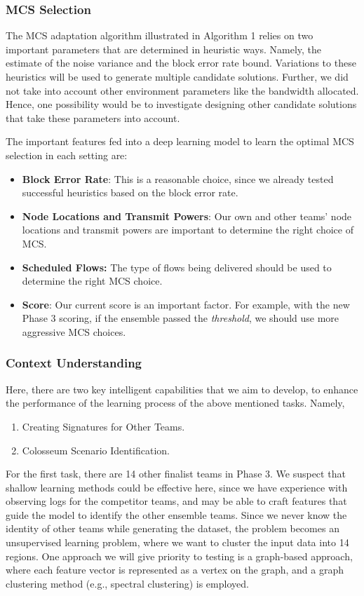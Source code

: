 \documentclass[11pt]{article}
\begin{document}
\subsubsection{MCS Selection}
The MCS adaptation algorithm illustrated in Algorithm 1 relies on two important parameters that are determined in heuristic ways. Namely, the estimate of the noise variance and the block error rate bound. Variations to these heuristics will be used to generate multiple candidate solutions. Further, we did not take into account other environment parameters like the bandwidth allocated. Hence, one possibility would be to investigate designing other candidate solutions that take these parameters into account.

The important features fed into a deep learning model to learn the optimal MCS selection in each setting are:
\begin{itemize}
    \item {\bf Block Error Rate}: This is a reasonable choice, since we already tested successful heuristics based on the block error rate.
    \item {\bf Node Locations and Transmit Powers}: Our own and other teams' node locations and transmit powers are important to determine the right choice of MCS.
    \item {\bf Scheduled Flows:} The type of flows being delivered should be used to determine the right MCS choice.
    \item {\bf Score}: Our current score is an important factor. For example, with the new Phase 3 scoring, if the ensemble passed the \emph{threshold}, we should use more aggressive MCS choices.
\end{itemize}
\subsubsection{Context Understanding}\label{sec:context}
Here, there are two key intelligent capabilities that we aim to develop, to enhance the performance of the learning process of the above mentioned tasks. Namely,
\begin{enumerate}
    \item Creating Signatures for Other Teams.
    \item Colosseum Scenario Identification.
\end{enumerate}
For the first task, there are 14 other finalist teams in Phase 3. We suspect that shallow learning methods could be effective here, since we have experience with observing logs for the competitor teams, and may be able to craft features that guide the model to identify the other ensemble teams. Since we never know the identity of other teams while generating the dataset, the problem becomes an unsupervised learning problem, where we want to cluster the input data into 14 regions. One approach we will give priority to testing is a graph-based approach, where each feature vector is represented as a vertex on the graph, and a graph clustering method (e.g., spectral clustering) is employed.
\end{document}
